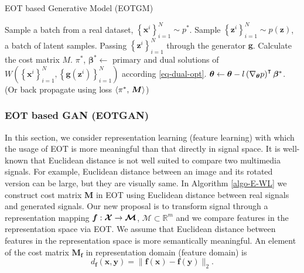 \begin{algorithm}[!t]
  \caption{EOT based Generative Model (EOTGM)}\label{algo-E-WL}
  \begin{algorithmic}[1]
    \STATE Sample  a batch from a real dataset, $\left\{ \bm{x}^{i} \right\}_{i=1}^{N} \sim p^{\ast}$. 
    \STATE Sample $\left\{ \bm{z}^{i} \right\}_{i=1}^{N} \sim p(\bm{z})$, a batch of latent samples.
    \STATE Passing $\left\{ \bm{z}^{i} \right\}_{i=1}^{N}$ through the generator $\bm{g}$.
    \STATE Calculate the cost matrix $M$.
    \STATE $\pi^{\ast}$, $\bm{\beta}^{\ast} \gets$ primary and dual
    solutions of $W(\left\{ \bm{x}^{i} \right\}_{i=1}^{N}, \left\{
      \bm{g}(\bm{z}^{i})\right\}_{i=1}^{N})$ according \eqref{eq-dual-opt}.
    \STATE $\bm{\theta} \gets \bm{\theta} - l \left(\nabla_{\bm{\theta}}{p}\right)^{\intercal}
    \bm{\beta}^{\ast}$. (Or back propagate using loss $\langle \pi^{\ast},\,\bm{M}\rangle$)
    \ENDWHILE
  \end{algorithmic}
\end{algorithm}

\subsubsection{EOT based GAN (EOTGAN)}

In this section, we consider representation learning (feature
learning) with which the usage of EOT is more meaningful than that
directly in signal space.
It is well-known that Euclidean distance is not well suited to compare
two multimedia signals. For example, Euclidean distance between an
image and its rotated version can be large, but they are visually same. In Algorithm \ref{algo-E-WL} we construct cost matrix $\bm{M}$ in EOT using 
Euclidean distance between real signals and generated signals. Our new proposal is to transform signal through a representation mapping 
$\bm{f}: \bm{\mathcal{X}} \rightarrow \bm{\mathcal{M}}$, $\bm{\mathcal{M}}\subset\mathbb{R}^{m}$ and we compare features in the representation space via EOT. We assume that Euclidean distance
between features in the representation space is more semantically
meaningful. An element of the cost matrix $\bm{M_f}$ in representation domain (feature domain) is
\begin{equation}\label{def-similarity}
  d_{\bm{f}}(\bm{x}, \bm{y}) = \|\bm{f}(\bm{x})-\bm{f}(\bm{y})\|_{2}.
\end{equation}


